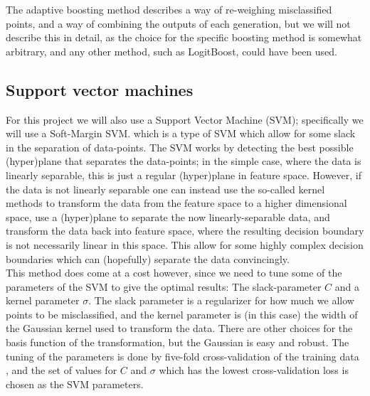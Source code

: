 \documentclass[a4paper,11pt]{article}
\begin{document}
\noindent The adaptive boosting method describes a way of re-weighing misclassified points, and a way of combining the outputs of each generation, but we will not describe this in detail, as the choice for the specific boosting method is somewhat arbitrary, and any other method, such as LogitBoost, could have been used.
\subsection{Support vector machines}
For this project we will also use a Support Vector Machine (SVM); specifically we will use a Soft-Margin SVM. which is a type of SVM which allow for some slack in the separation of data-points. The SVM works by detecting the best possible (hyper)plane that separates the data-points; in the simple case, where the data is linearly separable, this is just a regular (hyper)plane in feature space. However, if the data is not linearly separable one can instead use the so-called kernel methods to transform the data from the feature space to a higher dimensional space, use a (hyper)plane to separate the now linearly-separable data, and transform the data back into feature space, where the resulting decision boundary is not necessarily linear in this space. This allow for some highly complex decision boundaries which can (hopefully) separate the data convincingly.\\

\noindent This method does come at a cost however, since we need to tune some of the parameters of the SVM to give the optimal results: The slack-parameter $C$ and a kernel parameter $\sigma$. The slack parameter is a regularizer for how much we allow points to be misclassified, and the kernel parameter is (in this case) the width of the Gaussian kernel used to transform the data. There are other choices for the basis function of the transformation, but the Gaussian is easy and robust.
\noindent The tuning of the parameters is done by five-fold cross-validation of the training data%
, and the set of values for $C$ and $\sigma$ which has the lowest cross-validation loss is chosen as the SVM parameters.
\end{document}
